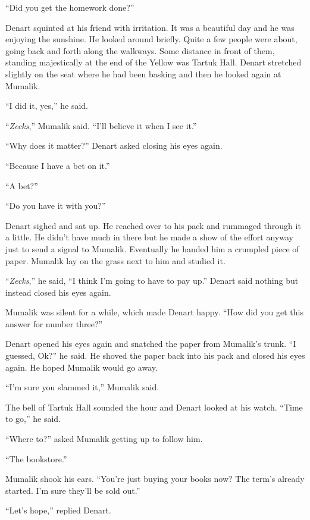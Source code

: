 
``Did you get the homework done?''

Denart squinted at his friend with irritation. It was a beautiful day and he was enjoying the
sunshine. He looked around briefly. Quite a few people were about, going back and forth along
the walkways. Some distance in front of them, standing majestically at the end of the Yellow was
Tartuk Hall. Denart stretched slightly on the seat where he had been basking and then he looked
again at Mumalik.

``I did it, yes,'' he said.

``\textit{Zecks},'' Mumalik said. ``I'll believe it when I see it.''

``Why does it matter?'' Denart asked closing his eyes again.

``Because I have a bet on it.''

``A bet?''

``Do you have it with you?''

Denart sighed and sat up. He reached over to his pack and rummaged through it a little. He
didn't have much in there but he made a show of the effort anyway just to send a signal to
Mumalik. Eventually he handed him a crumpled piece of paper. Mumalik lay on the grass next to
him and studied it.

``\textit{Zecks},'' he said, ``I think I'm going to have to pay up.'' Denart said nothing but
instead closed his eyes again.

Mumalik was silent for a while, which made Denart happy. ``How did you get this answer for
number three?''

Denart opened his eyes again and snatched the paper from Mumalik's trunk. ``I guessed, Ok?'' he
said. He shoved the paper back into his pack and closed his eyes again. He hoped Mumalik would
go away.

``I'm sure you slammed it,'' Mumalik said.

The bell of Tartuk Hall sounded the hour and Denart looked at his watch. ``Time to go,'' he
said.

``Where to?'' asked Mumalik getting up to follow him.

``The bookstore.''

Mumalik shook his ears. ``You're just buying your books now? The term's already started. I'm
sure they'll be sold out.''

``Let's hope,'' replied Denart.


